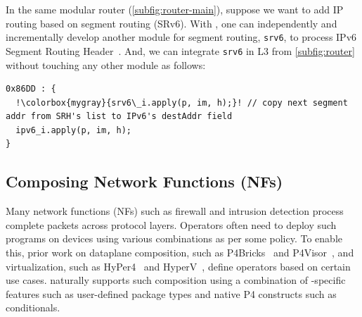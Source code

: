 \documentclass[letterpaper,twocolumn,10pt]{article}
\begin{document}


%
In the same modular router (\cref{subfig:router-main}), suppose we 
want to add IP routing based on segment routing (SRv6). With \ulang, 
one can independently and incrementally develop another module for 
segment routing, \texttt{srv6}, to process IPv6 Segment Routing
Header~\cite{srh}. And, we can integrate \texttt{srv6} in 
L3 from \cref{subfig:router} without touching any other module as 
follows:
\begin{lstlisting}[frame=none, escapechar=!]
0x86DD : {
  !\colorbox{mygray}{srv6\_i.apply(p, im, h);}! // copy next segment addr from SRH's list to IPv6's destAddr field
  ipv6_i.apply(p, im, h);
}
\end{lstlisting}




\subsection{Composing Network Functions (NFs)}
\label{subsection:composing-dataplane-programs-of-NFs}
Many network functions (NFs) such as firewall and intrusion detection
process complete packets across protocol layers. Operators often need
to deploy such programs on devices using various combinations as per
some policy. To enable this, prior work on dataplane composition, such
as P4Bricks~\cite{soni:hal-01632431} and
P4Visor~\cite{Zheng:2018:PLV:3281411.3281436}, and virtualization,
such as HyPer4~\cite{Hancock:2016:HUP:2999572.2999607} and
HyperV~\cite{8038396}, define operators based on certain use cases.
\ulang naturally supports such composition using a combination of
\ulang-specific features such as user-defined package types and native
P4 constructs such as conditionals.
\end{document}
